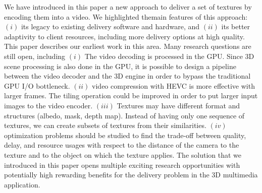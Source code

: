 \documentclass{vgtc}                          %
\begin{document}
We have introduced in this paper a new approach to deliver a set of textures by encoding them into a video. We highlighted themain features of this approach: $(i)$ its legacy to existing delivery software and hardware, and $(ii)$ its better adaptivity to client resources, including more delivery options at high quality. This paper describes our earliest work in this area. Many research questions are still open, including $(i)$ The video decoding is processed in the \gls{GPU}. Since 3D scene processing is also done in the \gls{GPU}, it is possible to design a pipeline between the video decoder and the 3D engine in order to bypass the traditional \gls{GPU} I/O bottleneck. $(ii)$ video compression with \gls{HEVC} is more effective with larger frames. The tiling operation could be improved in order to put larger input images to the video encoder. $(iii)$ Textures may have different format and structures (albedo, mask, depth map). Instead of having only one sequence of textures, we can create subsets of textures from their similarities. $(iv)$ optimization problems should be studied to find the trade-off between quality, delay, and resource usages with respect to the distance of the camera to the texture and to the object on which the texture applies. The solution that we introduced in this paper opens multiple exciting research opportunities with potentially high rewarding benefits for the delivery problem in the 3D multimedia application.





\end{document}
